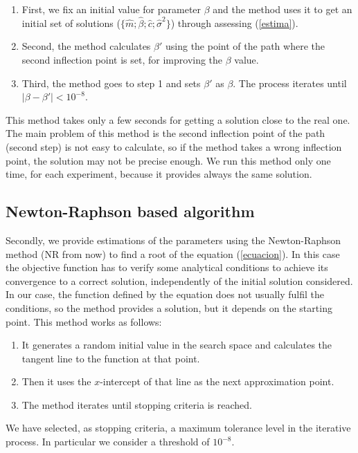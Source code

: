 \documentclass{sig-alternate}
\begin{document}
\begin{enumerate}
\item First, we fix an initial value for parameter $\beta$ and the method uses it to get an initial set of solutions ($\{\hat{m}; \hat{\beta}; \hat{c}; \hat{\sigma}^2\}$) through assessing (\ref{estima}).
\item Second, the method calculates $\beta'$ using the point of the path where the second inflection point is set, for improving the $\beta$ value.
\item Third,  the method goes to step 1 and sets $\beta'$ as $\beta$. The process iterates until $|\beta-\beta'|<10^{-8}$.

\end{enumerate}

This method takes only a few seconds for getting a solution close to the real one. The main problem of this method is the second inflection point of the path (second step) is not easy to calculate, so if the method takes a wrong inflection point, the solution may not be precise enough. We run this method only one time, for each experiment, because it provides always the same solution.

\subsection{Newton-Raphson based algorithm}
\label{subsec:NRS}

Secondly, we provide estimations of the parameters using the Newton-Raphson method (NR from now) to find a root of the equation (\ref{ecuacion}). In this case the objective function has to verify some analytical conditions to achieve its convergence to a correct solution, independently of the initial solution considered. In our case, the function defined by the equation does not usually fulfil the conditions, so the method provides a solution, but it depends on the starting point. This method works as follows:


\begin{enumerate}
\item It generates a random initial value in the search space and calculates the tangent line to the function at that point.
\item Then it uses the $x$-intercept of that line as the next approximation point.
\item The method iterates until stopping criteria is reached.
\end{enumerate}

We have selected, as stopping criteria, a maximum tolerance level in the iterative process. In particular we consider a threshold of $10^{-8}$.
\end{document}

